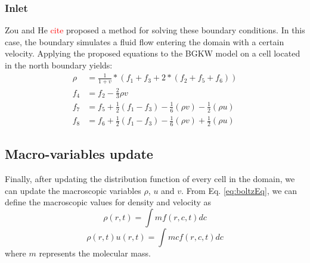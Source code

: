 \documentclass[12pt]{book}
\begin{document}
	\subsubsection{Inlet}
	 Zou and He \textcolor{red}{cite} proposed a method for solving these boundary conditions. In this case, the boundary simulates a fluid flow entering the domain with a certain velocity. Applying the proposed equations to the BGKW model on a cell located in the north boundary yields:
	\begin{equation*}
		\begin{aligned}
			\rho &= \frac{1}{1+v} * \left(f_1 + f_3 + 2 * \left(f_2 + f_5 + f_6\right)\right) \\
			f_4 &= f_2 - \frac{2}{3}\rho v \\
			f_7 &= f_5 + \frac{1}{2}\left(f_1 - f_3\right) - \frac{1}{6}\left(\rho v\right) - \frac{1}{2}\left(\rho u\right) \\
			f_8 &= f_6 + \frac{1}{2}\left(f_1 - f_3\right) - \frac{1}{6}\left(\rho v\right) + \frac{1}{2}\left(\rho u\right)
		\end{aligned}
	\end{equation*}
\subsection{Macro-variables update}\label{sec:mpUpd}
Finally, after updating the distribution function of every cell in the domain, we can update the macroscopic variables $\rho$, $u$ and $v$.
From Eq. \ref{eq:boltzEq}, we can define the macroscopic values for density and velocity as
\begin{equation}\label{eq:densityUp}
\rho (r,t) = \int  mf(r,c,t)dc
\end{equation}
\begin{equation}\label{eq:velocityUp}
\rho (r,t) u(r,t) = \int  mcf(r,c,t)dc
\end{equation}
where $m$ represents the molecular mass.
\end{document}
